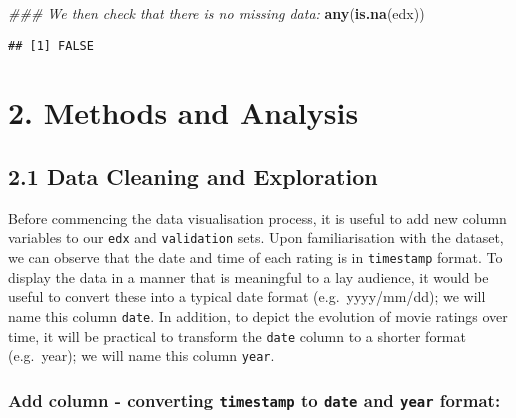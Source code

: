 \documentclass[]{article}
\newenvironment{Shaded}{\begin{snugshade}}{\end{snugshade}}
\newcommand{\CommentTok}[1]{\textcolor[rgb]{0.56,0.35,0.01}{\textit{#1}}}
\newcommand{\KeywordTok}[1]{\textcolor[rgb]{0.13,0.29,0.53}{\textbf{#1}}}
\newcommand{\NormalTok}[1]{#1}
\newcommand{\OperatorTok}[1]{\textcolor[rgb]{0.81,0.36,0.00}{\textbf{#1}}}
\begin{document}
\begin{Shaded}
\begin{Highlighting}[]
\CommentTok{### We then check that there is no missing data:}
\KeywordTok{any}\NormalTok{(}\KeywordTok{is.na}\NormalTok{(edx))}
\end{Highlighting}
\end{Shaded}

\begin{verbatim}
## [1] FALSE
\end{verbatim}

\hypertarget{methods-and-analysis-1}{%
\section{2. Methods and Analysis}\label{methods-and-analysis-1}}

\hypertarget{data-cleaning-and-exploration-1}{%
\subsection{2.1 Data Cleaning and
Exploration}\label{data-cleaning-and-exploration-1}}

Before commencing the data visualisation process, it is useful to add
new column variables to our \texttt{edx} and \texttt{validation} sets.
Upon familiarisation with the dataset, we can observe that the date and
time of each rating is in \texttt{timestamp} format. To display the data
in a manner that is meaningful to a lay audience, it would be useful to
convert these into a typical date format (e.g.~yyyy/mm/dd); we will name
this column \texttt{date}. In addition, to depict the evolution of movie
ratings over time, it will be practical to transform the \texttt{date}
column to a shorter format (e.g.~year); we will name this column
\texttt{year}.

\hypertarget{add-column---converting-timestamp-to-date-and-year-format}{%
\subsubsection{\texorpdfstring{Add column - converting
\texttt{timestamp} to \texttt{date} and \texttt{year}
format:}{Add column - converting timestamp to date and year format:}}\label{add-column---converting-timestamp-to-date-and-year-format}}

\begin{Shaded}
\end{Shaded}
\end{document}
